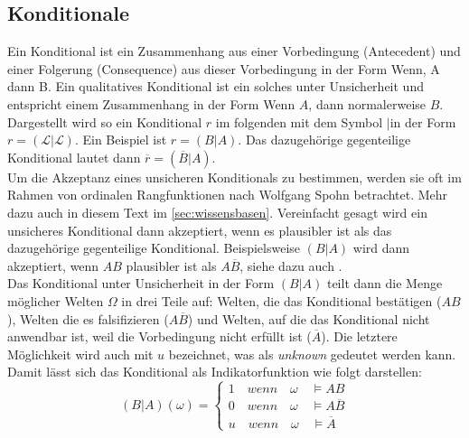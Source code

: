\documentclass[12pt,a4paper]{article}
\newcommand{\lag}{\mathcal{L}}
\begin{document}
\subsection{Konditionale}
Ein Konditional ist ein Zusammenhang aus einer Vorbedingung (Antecedent) und einer Folgerung (Consequence) aus dieser Vorbedingung in der Form \glqq Wenn, A dann B\grqq . Ein qualitatives Konditional ist ein solches unter  Unsicherheit und entspricht einem Zusammenhang in der Form \glqq Wenn $A$, dann normalerweise $B$\grqq . Dargestellt wird so ein Konditional $r$ im folgenden mit dem Symbol \glqq$|$\grqq \space in der Form $r = ( \lag | \lag)$. Ein Beispiel ist $r = (B|A)$. Das dazugehörige gegenteilige Konditional lautet dann $\overline{r} = (\overline{B}|A)$.\\
Um die Akzeptanz eines unsicheren Konditionals zu bestimmen, werden sie oft im Rahmen von ordinalen Rangfunktionen nach Wolfgang Spohn betrachtet. Mehr dazu auch in diesem Text im  \autoref{sec:wissensbasen}. Vereinfacht gesagt wird ein unsicheres Konditional dann  akzeptiert, wenn es plausibler ist als das dazugehörige gegenteilige Konditional. Beispielsweise $(B|A)$ wird  dann akzeptiert, wenn $A B$ plausibler ist als $A \overline{B}$, siehe dazu auch \cite{isberner14}. \\
Das Konditional unter Unsicherheit in der Form $(B|A)$ teilt dann die Menge möglicher Welten $\Omega$ in drei Teile auf: Welten, die das Konditional bestätigen ($A B$), Welten die es falsifizieren ($A \overline{B}$) und Welten, auf die das Konditional nicht anwendbar ist, weil die Vorbedingung nicht erfüllt ist ($\overline{A}$). Die letztere Möglichkeit wird auch mit $u$ bezeichnet, was als \textit{unknown} gedeutet werden kann. Damit lässt sich das Konditional als Indikatorfunktion wie folgt darstellen:
\[
  (B|A)(\omega)=\begin{cases}
               1 \quad wenn \quad \omega \quad \models AB\\
               0 \quad wenn \quad \omega \quad \models A\overline{B}\\
               u \quad wenn \quad \omega \quad \models \overline{A}
            \end{cases}
\]
\end{document}
